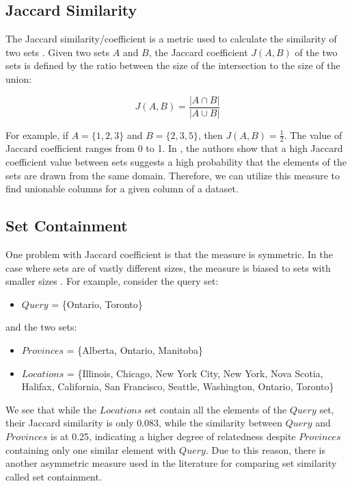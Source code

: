 \subsection{Jaccard Similarity}\label{js}

The Jaccard similarity/coefficient is a metric used to calculate the similarity of two sets  \cite{miningOfMassiveDatasets}. Given two sets \(A\) and \(B\), the Jaccard coefficient \(J(A, B)\) of the two sets is defined by the ratio between the size of the intersection to the size of the union:

\[
J(A, B) = \frac{|A \cap B|}{|A \cup B|}
\]

For example, if \(A = \{1, 2, 3\}\) and \(B = \{2, 3, 5\}\), then \(J(A, B) = \frac{1}{2}\). The value of Jaccard coefficient ranges from 0 to 1. In \cite{tusZhu}, the authors show that a high Jaccard coefficient value between sets suggests a high probability that the elements of the sets are drawn from the same domain. Therefore, we can utilize this measure to find unionable columns for a given column of a dataset.

\subsection{Set Containment}\label{jc}

One problem with Jaccard coefficient is that the measure is symmetric. In the case where sets are of vastly different sizes, the measure is biased to sets with smaller sizes \cite{lshEnsemble}. For example, consider the query set:

\begin{itemize}
    \item \(Query\) = \{Ontario, Toronto\}
\end{itemize}

and the two sets:

\begin{itemize}
    \item \(Provinces\) = \{Alberta, Ontario, Manitoba\}
    \item \(Locations\) = \{Illinois, Chicago, New York City, New York, Nova Scotia, Halifax, California, San Francisco, Seattle, Washington, Ontario, Toronto\}
\end{itemize}

We see that while the \(Locations\) set contain all the elements of the \(Query\) set, their Jaccard similarity is only 0.083, while the similarity between \(Query\) and \(Provinces\) is at 0.25, indicating a higher degree of relatedness despite \(Provinces\) containing only one similar element with \(Query\). Due to this reason, there is another asymmetric measure used in the literature for comparing set similarity called set containment.

